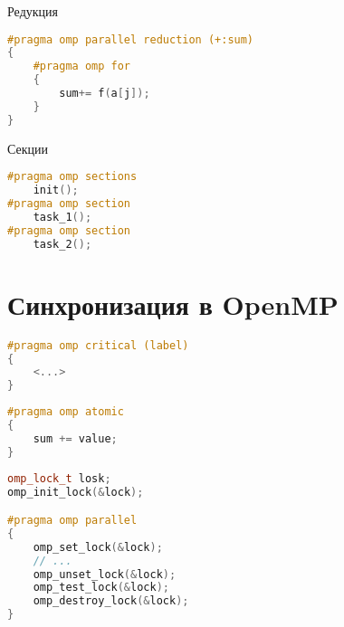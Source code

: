 \begin{frame}[fragile]{Редукция}

\begin{lstlisting}[language=C++,basicstyle=\ttfamily,keywordstyle=\color{blue},basicstyle=\scriptsize]
#pragma omp parallel reduction (+:sum)
{
    #pragma omp for
    {
        sum+= f(a[j]);
    }
}
\end{lstlisting}

\end{frame}

\begin{frame}[fragile]{Секции}

\begin{lstlisting}[language=C++,basicstyle=\ttfamily,keywordstyle=\color{blue},basicstyle=\scriptsize]
#pragma omp sections
    init();
#pragma omp section
    task_1();
#pragma omp section
    task_2();
\end{lstlisting}

\end{frame}

\section{Синхронизация в OpenMP}

\begin{frame}[fragile]

\begin{lstlisting}[language=C++,basicstyle=\ttfamily,keywordstyle=\color{blue},basicstyle=\scriptsize]
#pragma omp critical (label)
{
    <...>
}
\end{lstlisting}

\end{frame}

\begin{frame}[fragile]

\begin{lstlisting}[language=C++,basicstyle=\ttfamily,keywordstyle=\color{blue},basicstyle=\scriptsize]
#pragma omp atomic
{
    sum += value;
}
\end{lstlisting}

\end{frame}

\begin{frame}[fragile]

\begin{lstlisting}[language=C++,basicstyle=\ttfamily,keywordstyle=\color{blue},basicstyle=\scriptsize]
omp_lock_t losk;
omp_init_lock(&lock);

#pragma omp parallel
{
    omp_set_lock(&lock);
    // ...
    omp_unset_lock(&lock);
    omp_test_lock(&lock);
    omp_destroy_lock(&lock);
}
\end{lstlisting}

\end{frame}

